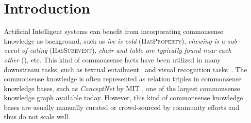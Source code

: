 \section{Introduction}
Artificial Intelligent systems can benefit from incorporating commonsense knowledge as background, 
such as \textit{ice is cold} (\textsc{HasProperty}), 
\textit{chewing is a sub-event of eating} (\textsc{HasSubevent}), 
\textit{chair and table are typically found near each other} (\lnear), etc. 
This kind of commonsense facts have been utilized in many downstream tasks, such as textual entailment~\cite{dagan2009recognizing,bowman2015large} and visual recognition tasks~\cite{zhu2014reasoning}.
The commonsense knowledge is often represented as relation triples in commonsense knowledge bases, 
such as \textit{ConceptNet} by MIT \cite{speer2012representing}, one of the largest commonsense
knowledge graph available today.
However, this kind of commonsense knowledge bases are usually manually curated or crowd-sourced by community efforts and thus do not scale well.

